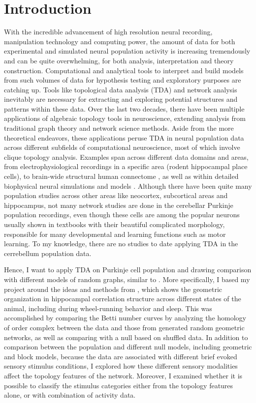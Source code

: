 \section{Introduction}

With the incredible advancement of high resolution neural recording, manipulation technology and computing power, the amount of data for both experimental and simulated neural population activity is increasing tremendously and can be quite overwhelming, for both analysis, interpretation and theory construction. Computational and analytical tools to interpret and build models from such volumes of data for hypothesis testing and exploratory purposes are catching up. Tools like topological data analysis (TDA) and network analysis inevitably are necessary for extracting and exploring potential structures and patterns within these data. Over the last two decades, there have been multiple applications of algebraic topology tools in neuroscience, extending analysis from traditional graph theory and network science methods. Aside from the more theoretical endeavors, these applications peruse TDA in neural population data across different subfields of computational neuroscience, most of which involve clique topology analysis. Examples span across different data domains and areas, from electrophysiological recordings in a specific area \cite{Giusti2015-uo} (rodent hippocampal place cells), to brain-wide structural human connectome \cite{Sizemore2018-ql}, as well as within detailed biophysical neural simulations and models \cite{Reimann2017-ji}. Although there have been quite many population studies across other areas like neocortex, subcortical areas and hippocampus, not many network studies are done in the cerebellar Purkinje population recordings, even though these cells are among the popular neurons usually shown in textbooks with their beautiful complicated morphology, responsible for many developmental and learning functions such as motor learning. To my knowledge, there are no studies to date applying TDA in the cerrebellum population data.




Hence, I want to apply TDA on Purkinje cell population and drawing comparison with different models of random graphs, similar to \cite{Giusti2015-uo}. More specifically, I based my project around the ideas and methods from \cite{Giusti2015-uo}, which shows the geometric organization in hippocampal correlation structure across different states of the animal, including during wheel-running behavior and sleep. This was accomplished by comparing the Betti number curves by analyzing the homology of order complex between the data and those from generated random geometric networks, as well as comparing with a null based on shuffled data. In addition to comparison between the population and different null models, including geometric and block models, because the data are associated with different brief evoked sensory stimulus conditions, I explored how these different sensory modalities affect the topology features of the network. Moreover, I examined whether it is possible to classify the stimulus categories either from the topology features alone, or with combination of activity data.